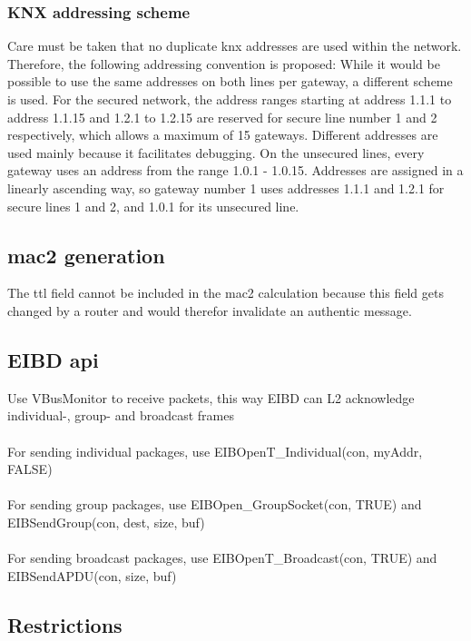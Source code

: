\subsubsection{KNX addressing scheme}

Care must be taken that no duplicate \gls{knx} addresses are used within the network. Therefore, the following addressing convention is proposed:
While it would be possible to use the same addresses on both lines per gateway, a different scheme is used.
For the secured network, the address ranges starting at address 1.1.1 to address 1.1.15 and 1.2.1 to 1.2.15 are reserved for secure line number
1 and 2 respectively, which allows a maximum of 15 gateways. Different addresses are used mainly because it facilitates debugging. 
On the unsecured lines, every gateway uses an address from the range 1.0.1 - 1.0.15. Addresses are assigned in a linearly ascending way, so gateway number 1
uses addresses 1.1.1 and 1.2.1 for secure lines 1 and 2, and 1.0.1 for its unsecured line.

\subsection{\gls{mac2} generation}

The \gls{ttl} field cannot be included in the \gls{mac2} calculation because this field gets changed by a router and would therefor invalidate an authentic message.

\subsection{EIBD \gls{api}}

Use VBusMonitor to receive packets, this way EIBD can L2 acknowledge individual-, group- and broadcast frames
\\
\\
For sending individual packages, use EIBOpenT\_Individual(con, myAddr, FALSE)
\\
\\
For sending group packages, use EIBOpen\_GroupSocket(con, TRUE) and EIBSendGroup(con, dest, size, buf)
\\
\\
For sending broadcast packages, use EIBOpenT\_Broadcast(con, TRUE) and EIBSendAPDU(con, size, buf)

\subsection{Restrictions }

